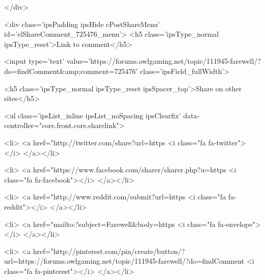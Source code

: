 		
	</div>

	

	



<div class='ipsPadding ipsHide cPostShareMenu' id='elShareComment_725476_menu'>
	<h5 class='ipsType_normal ipsType_reset'>Link to comment</h5>
	
		
	
	
	<input type='text' value='https://forums.owlgaming.net/topic/111945-farewell/?do=findComment&amp;comment=725476' class='ipsField_fullWidth'>

	
	<h5 class='ipsType_normal ipsType_reset ipsSpacer_top'>Share on other sites</h5>
	

	<ul class='ipsList_inline ipsList_noSpacing ipsClearfix' data-controller="core.front.core.sharelink">
		
			<li>
<a href="http://twitter.com/share?url=https%
	<i class="fa fa-twitter"></i>
</a></li>
		
			<li>
<a href="https://www.facebook.com/sharer/sharer.php?u=https%
	<i class="fa fa-facebook"></i>
</a></li>
		
			<li>
<a href="http://www.reddit.com/submit?url=https%
	<i class="fa fa-reddit"></i>
</a></li>
		
			<li>
<a href="mailto:?subject=Farewell&body=https%
	<i class="fa fa-envelope"></i>
</a></li>
		
			<li>
<a href="http://pinterest.com/pin/create/button/?url=https://forums.owlgaming.net/topic/111945-farewell/?do=findComment%
	<i class="fa fa-pinterest"></i>
</a></li>
		
